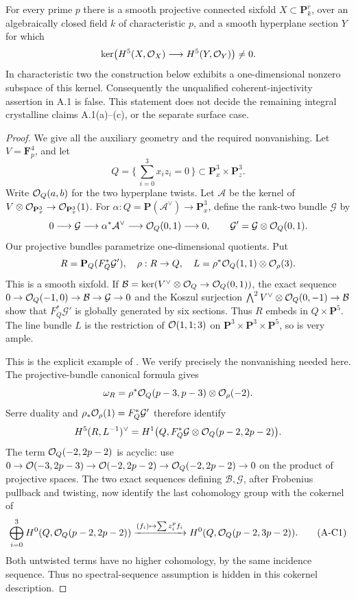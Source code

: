 \begin{theorem}
\label{thm:A-coherent-restriction-false}
For every prime $p$ there is a smooth projective connected
sixfold $X\subset\mathbf P^r_k$, over an algebraically closed
field $k$ of characteristic $p$, and a smooth hyperplane section
$Y$ for which
\[
 \ker\bigl(H^5(X,\mathcal O_X)\longrightarrow H^5(Y,\mathcal O_Y)\bigr)\ne0.
\]
In characteristic two the construction below exhibits a
one-dimensional nonzero subspace of this kernel. Consequently
the unqualified coherent-injectivity assertion in A.1 is false.
This statement does not decide the remaining integral crystalline
claims A.1(a)--(c), or the separate surface case.
\end{theorem}
\begin{proof}
We give all the auxiliary geometry and the required nonvanishing.
Let $V=\mathbf F_p^4$, and let
\[
 Q=\{\,\textstyle\sum_{i=0}^3x_i z_i=0\,\}
       \subset\mathbf P^3_x\times\mathbf P^3_z .
\]
Write $\mathcal O_Q(a,b)$ for the two hyperplane twists. Let
$\mathcal A$ be the kernel of
$V\otimes\mathcal O_{\mathbf P^3_x}\to\mathcal O_{\mathbf P^3_x}(1)$.
For $\alpha:Q=\mathbf P(\mathcal A^\vee)\to\mathbf P^3_x$,
define the rank-two bundle $\mathcal G$ by
\[
 0\longrightarrow\mathcal G\longrightarrow
 \alpha^*\mathcal A^\vee\longrightarrow\mathcal O_Q(0,1)
 \longrightarrow0,
 \qquad \mathcal G'=\mathcal G\otimes\mathcal O_Q(0,1).
\]
Our projective bundles parametrize one-dimensional quotients.
Put
\[
 R=\mathbf P_Q(F_Q^*\mathcal G'),\quad \rho:R\to Q,\quad
 L=\rho^*\mathcal O_Q(1,1)\otimes\mathcal O_\rho(3).
\]
This is a smooth sixfold. If
$\mathcal B=\ker(V^\vee\otimes\mathcal O_Q\to\mathcal O_Q(0,1))$,
the exact sequence
$0\to\mathcal O_Q(-1,0)\to\mathcal B\to\mathcal G\to0$
and the Koszul surjection
$\bigwedge^2V^\vee\otimes\mathcal O_Q(0,-1)\to\mathcal B$
show that $F_Q^*\mathcal G'$ is globally generated by six
sections. Thus $R$ embeds in $Q\times\mathbf P^5$.
The line bundle $L$ is the restriction of $\mathcal O(1,1;3)$
on $\mathbf P^3\times\mathbf P^3\times\mathbf P^5$,
so is very ample.

This is the explicit example of
\citet[Section~2, Claim and proof, arXiv pp.~3--5]{LauritzenRao1997}.
We verify precisely the nonvanishing needed here.
The projective-bundle canonical formula gives
\[
 \omega_R=\rho^*\mathcal O_Q(p-3,p-3)\otimes\mathcal O_\rho(-2).
\]
Serre duality and $\rho_*\mathcal O_\rho(1)=F_Q^*\mathcal G'$
therefore identify
\[
 H^5(R,L^{-1})^\vee
 =H^1\bigl(Q,F_Q^*\mathcal G\otimes
                     \mathcal O_Q(p-2,2p-2)\bigr).
\]
The term $\mathcal O_Q(-2,2p-2)$ is acyclic: use
$0\to\mathcal O(-3,2p-3)\to\mathcal O(-2,2p-2)
\to\mathcal O_Q(-2,2p-2)\to0$ on the product of projective spaces.
The two exact sequences defining $\mathcal B,\mathcal G$,
after Frobenius pullback and twisting, now identify the last
cohomology group with the cokernel of
\[
 \bigoplus_{i=0}^3 H^0(Q,\mathcal O_Q(p-2,2p-2))
 \xrightarrow{(f_i)\mapsto\sum z_i^p f_i}
 H^0(Q,\mathcal O_Q(p-2,3p-2)).
 \tag{A-C1}
\]
Both untwisted terms have no higher cohomology, by the same
incidence sequence. Thus no spectral-sequence assumption is hidden
in this cokernel description.


\end{proof}
